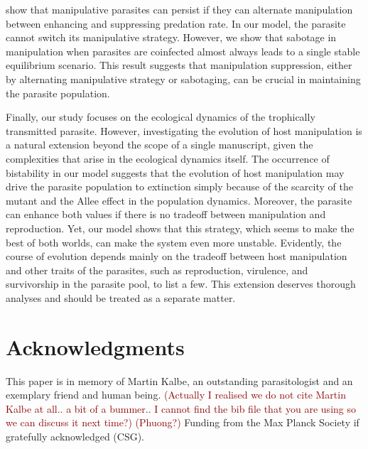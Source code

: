 \documentclass[11pt]{article}
\newcommand{\cha}[1]{\textcolor{darkred}{(#1)}}
\begin{document}
\cite{Iritani2018} show that manipulative parasites can persist if they can alternate manipulation between enhancing and suppressing predation rate. 
In our model, the parasite cannot switch its manipulative strategy. However, we show that sabotage in manipulation when parasites are coinfected almost always leads to a single stable equilibrium scenario. 
This result suggests that manipulation suppression, either by alternating manipulative strategy or sabotaging, can be crucial in maintaining the parasite population.

Finally, our study focuses on the ecological dynamics of the trophically transmitted parasite. 
However, investigating the evolution of host manipulation is a natural extension beyond the scope of a single manuscript, given the complexities that arise in the ecological dynamics itself. 
The occurrence of bistability in our model suggests that the evolution of host manipulation may drive the parasite population to extinction simply because of the scarcity of the mutant and the Allee effect in the population dynamics. 
Moreover, the parasite can enhance both values if there is no tradeoff between manipulation and reproduction. 
Yet, our model shows that this strategy, which seems to make the best of both worlds, can make the system even more unstable. 
Evidently, the course of evolution depends mainly on the tradeoff between host manipulation and other traits of the parasites, such as reproduction, virulence, and survivorship in the parasite pool, to list a few. This extension deserves thorough analyses and should be treated as a separate matter.




 \section*{Acknowledgments}
This paper is in memory of Martin Kalbe, an outstanding parasitologist and an exemplary friend and human being.
\cha{Actually I realised we do not cite Martin Kalbe at all.. a bit of a bummer.. I cannot find the bib file that you are using so we can discuss it next time?}
\cha{Phuong?}
Funding from the Max Planck Society if gratefully acknowledged (CSG).
\end{document}
